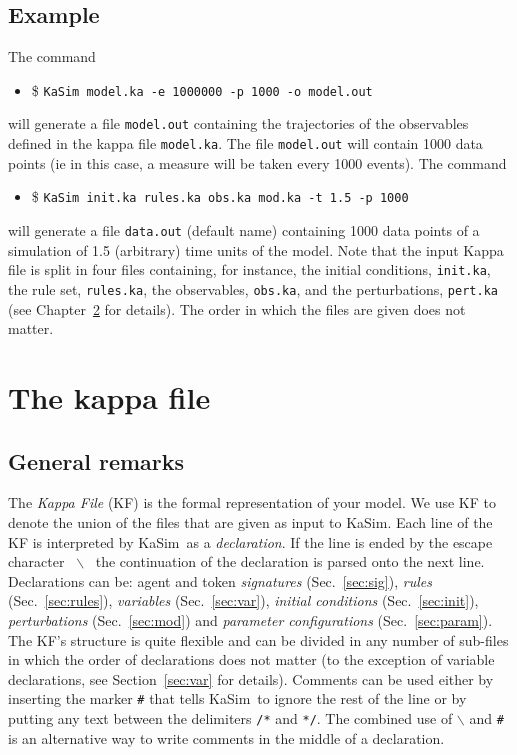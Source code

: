 \documentclass[11pt]{book}
\def\KaSim{\textsf{KaSim}}
\def\ttt#1{\texttt{#1}}
\def\bs{\backslash}
\def\ie{ie }
\def\ITE#1{\begin{itemize}#1\end{itemize}}
\begin{document}
\section{Example}
The command 
\ITE{
\item[\$] \ttt{KaSim model.ka -e 1000000 -p 1000 -o model.out}  
}
will generate a file \ttt{model.out} containing the trajectories of the observables defined in the kappa file \ttt{model.ka}. The file \ttt{model.out} will contain 1000 data points (\ie in this case, a measure will be taken every 1000 events). The command
\ITE{
\item[\$] \ttt{KaSim init.ka rules.ka obs.ka mod.ka -t 1.5 -p 1000}  
}
will generate a file \ttt{data.out} (default name) containing 1000 data points of a simulation of 1.5 (arbitrary) time units of the model. Note that the input Kappa file is split in four files containing, for instance, the initial conditions, \ttt{init.ka}, the rule set, \ttt{rules.ka}, the observables, \ttt{obs.ka}, and the perturbations, \ttt{pert.ka} (see Chapter~\ref{chap:kappa} for details). The order in which the files are given does not matter.

\chapter{The kappa file}\label{chap:kappa}

\section{General remarks}
The \emph{Kappa File} (KF) is the formal
representation of your model. We use KF to denote
the union of the files that are given as input to \KaSim. Each line of
the KF is interpreted by \KaSim~as a
\emph{declaration}. If the line is ended by the
escape character~{\textquotesingle} \ttt{$\bs$}{\textquotesingle} ~the
continuation of the declaration is parsed onto the
next line. Declarations can be: agent and token \emph{signatures}
(Sec.~\ref{sec:sig}), \emph{rules} (Sec.~\ref{sec:rules}),
\emph{variables} (Sec.~\ref{sec:var}), \emph{initial
  conditions} (Sec.~\ref{sec:init}),
\emph{perturbations} (Sec.~\ref{sec:mod}) and
\emph{parameter configurations} (Sec.~\ref{sec:param}). The
KF's structure is quite flexible and can be divided
in any number of sub-files in which the order of
declarations does not matter (to the exception of
variable declarations, see Section~\ref{sec:var}
for details). Comments can be used either by inserting
the marker \ttt{\#} that tells \KaSim~to ignore the rest of the line
or by putting any text between the delimiters \ttt{/*} and \ttt{*/}. The
combined use of \ttt{$\bs$} and \ttt{\#} is an alternative way to
write comments in the middle of a declaration.
\end{document}
